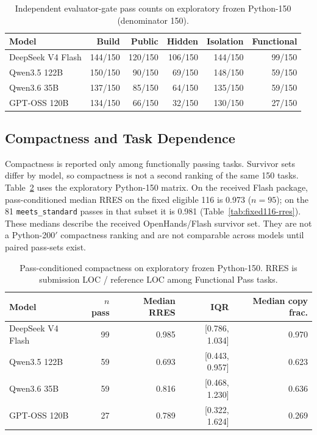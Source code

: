\documentclass[acmsmall,anonymous,review,screen]{acmart}
\newcommand{\rres}{\textsc{RRES}\xspace}
\begin{document}
\begin{table}[t]
  \caption{Independent evaluator-gate pass counts on exploratory frozen
  Python-150 (denominator 150).}
  \label{tab:python150-gates}
  \centering
  \begin{tabular}{lrrrrr}
  \toprule
  \textbf{Model} & \textbf{Build} & \textbf{Public} & \textbf{Hidden} & \textbf{Isolation} & \textbf{Functional} \\
  \midrule
  DeepSeek V4 Flash & 144/150 & 120/150 & 106/150 & 144/150 & 99/150 \\
  Qwen3.5 122B & 150/150 & 90/150 & 69/150 & 148/150 & 59/150 \\
  Qwen3.6 35B & 137/150 & 85/150 & 64/150 & 135/150 & 59/150 \\
  GPT-OSS 120B & 134/150 & 66/150 & 32/150 & 130/150 & 27/150 \\
  \bottomrule
  \end{tabular}
\end{table}

\subsection{Compactness and Task Dependence}

Compactness is reported only among functionally passing tasks. Survivor sets
differ by model, so compactness is not a second ranking of the same 150 tasks.
Table~\ref{tab:compactness} uses the exploratory Python-150 matrix.
On the received Flash package, pass-conditioned median \rres on the fixed
eligible 116 is 0.973 ($n=95$); on the 81 \texttt{meets\_standard} passes in
that subset it is 0.981 (Table~\ref{tab:fixed116-rres}). These medians describe
the received OpenHands/Flash survivor set. They are not a Python-200$'$
compactness ranking and are not comparable across models until paired
pass-sets exist.

\begin{table}[t]
  \caption{Pass-conditioned RRES on the fixed eligible 116-task Flash subset.}
  \label{tab:fixed116-rres}
  \centering
  
\end{table}

\begin{table}[t]
  \caption{Pass-conditioned compactness on exploratory frozen Python-150.
  RRES is submission LOC / reference LOC among Functional Pass tasks.}
  \label{tab:compactness}
  \centering
  \begin{tabular}{lrrrr}
  \toprule
  \textbf{Model} & \textbf{$n$ pass} & \textbf{Median RRES} & \textbf{IQR} & \textbf{Median copy frac.} \\
  \midrule
  DeepSeek V4 Flash & 99 & 0.985 & [0.786, 1.034] & 0.970 \\
  Qwen3.5 122B & 59 & 0.693 & [0.443, 0.957] & 0.623 \\
  Qwen3.6 35B & 59 & 0.816 & [0.468, 1.230] & 0.636 \\
  GPT-OSS 120B & 27 & 0.789 & [0.322, 1.624] & 0.269 \\
  \bottomrule
  \end{tabular}
\end{table}
\end{document}
